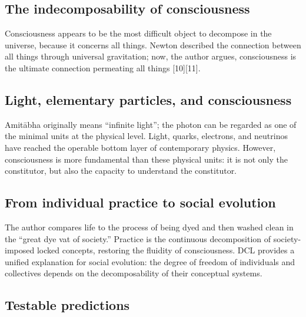 \documentclass[11pt,a4paper]{article}
\begin{document}
\subsection{The indecomposability of consciousness}

Consciousness appears to be the most difficult object to decompose in the universe, because it concerns all things. Newton described the connection between all things through universal gravitation; now, the author argues, consciousness is the ultimate connection permeating all things [10][11].

\subsection{Light, elementary particles, and consciousness}

Amit\={a}bha originally means ``infinite light''; the photon can be regarded as one of the minimal units at the physical level. Light, quarks, electrons, and neutrinos have reached the operable bottom layer of contemporary physics. However, consciousness is more fundamental than these physical units: it is not only the constitutor, but also the capacity to understand the constitutor.

\subsection{From individual practice to social evolution}

The author compares life to the process of being dyed and then washed clean in the ``great dye vat of society.'' Practice is the continuous decomposition of society-imposed locked concepts, restoring the fluidity of consciousness. DCL provides a unified explanation for social evolution: the degree of freedom of individuals and collectives depends on the decomposability of their conceptual systems.

\subsection{Testable predictions}
\end{document}
